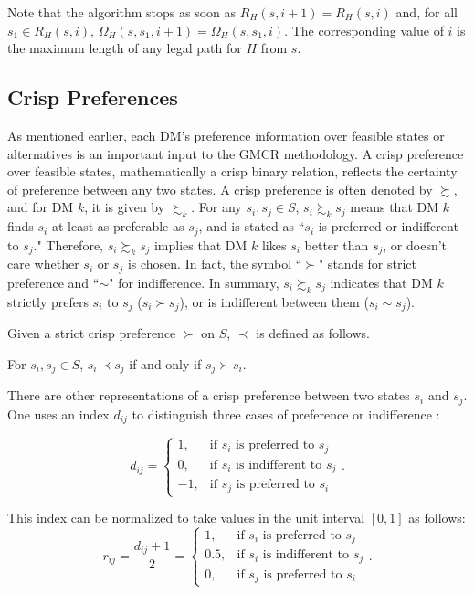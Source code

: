 \noindent Note that the algorithm stops as soon as $R_H(s, i + 1) = R_H(s, i)$ and, for all $s_1 \in R_H(s, i)$, $\Omega_H(s, s_1, i+1) = \Omega_H(s, s_1, i)$. The corresponding value of $i$ is the maximum length of any legal path for $H$ from $s$.

\subsection{Crisp Preferences}\label{subsec-crisp-pref}

As mentioned earlier, each DM's preference information over feasible states or alternatives is an important input to the GMCR methodology. A crisp preference over feasible states, mathematically a crisp binary relation, reflects the certainty of preference between any two states. A crisp preference is often denoted by $\succsim$, and for DM $k$, it is given by $\succsim_k$. For any $s_i, s_j \in S$, $s_i \succsim_k s_j$ means that DM $k$ finds $s_i$ at least as preferable as $s_j$, and is stated as ``$s_i$ is preferred or indifferent to $s_j$." Therefore, $s_i \succsim_k s_j$ implies that DM $k$ likes $s_i$ better than $s_j$, or doesn't care whether $s_i$ or $s_j$ is chosen. In fact, the symbol ``$\succ$" stands for strict preference and ``$\sim$" for indifference. In summary, $s_i \succsim_k s_j$ indicates that DM $k$ strictly prefers $s_i$ to $s_j$ ($s_i \succ s_j$), or is indifferent between them ($s_i \sim s_j$).

Given a strict crisp preference $\succ$ on $S$, $\prec$ is defined as follows.
\begin{definition} \rm
For $s_i, s_j \in S$, $s_i \prec s_j$ if and only if $s_j \succ s_i$.
\end{definition}

There are other representations of a crisp preference between two states $s_i$ and $s_j$. One uses an index $d_{ij}$ to distinguish three cases of preference or indifference \citep{Garcia&Montero2006}:

$$d_{ij}=\left\{ \begin{array}{rl}
 1, & \text{if } s_i \text{ is preferred to } s_j \\
 0, & \text{if } s_i \text{ is indifferent to } s_j \\
 -1, & \text{if } s_j \text{ is preferred to } s_i
 \end{array}
 \right..$$

This index can be normalized to take values in the unit interval $[0, 1]$ as follows:
 \begin{equation}\label{norm-crisp-pref}
 r_{ij}=\frac{d_{ij}+1}{2}=
 \left\{
 \begin{array}{rl}
 1, & \text{if } s_i \text{ is preferred to } s_j \\
 0.5, & \text{if } s_i \text{ is indifferent to } s_j \\
 0, & \text{if } s_j \text{ is preferred to } s_i
 \end{array}
 \right..
 \end{equation}

